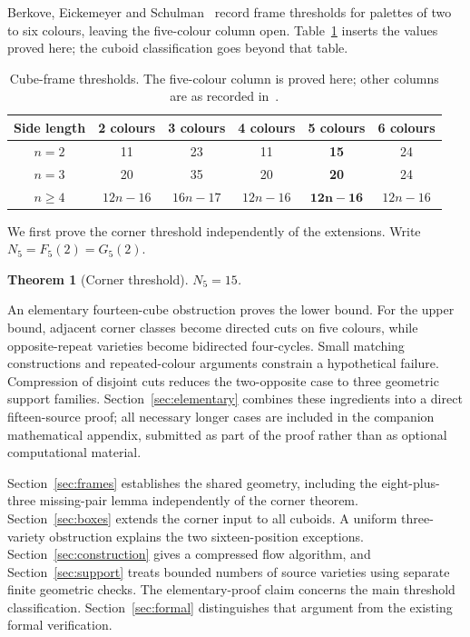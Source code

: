\documentclass[11pt]{article}
\newtheorem{theorem}{Theorem}
\theoremstyle{remark}
\begin{document}
Berkove, Eickemeyer and Schulman~\cite[Section 8, Table 7]{BES} record
frame thresholds for palettes of two to six colours, leaving the
five-colour column open. Table~\ref{tab:palette-thresholds} inserts the
values proved here; the cuboid classification goes beyond that table.
\begin{table}[ht]
\centering
\small
\begin{tabular}{c c c c c c}
\toprule
Side length & 2 colours & 3 colours & 4 colours & \textbf{5 colours} & 6 colours\\
\midrule
$n=2$ & 11 & 23 & 11 & \textbf{15} & 24\\
$n=3$ & 20 & 35 & 20 & \textbf{20} & 24\\
$n\ge4$ & $12n-16$ & $16n-17$ & $12n-16$ & $\boldsymbol{12n-16}$ & $12n-16$\\
\bottomrule
\end{tabular}
\caption{Cube-frame thresholds. The five-colour column is proved here;
other columns are as recorded in~\cite[Table 7]{BES}.}
\label{tab:palette-thresholds}
\end{table}

We first prove the corner threshold independently of the extensions.
Write $N_5=F_5(2)=G_5(2)$.
\begin{theorem}[Corner threshold]\label{thm:main}
$N_5=15$.
\end{theorem}
An elementary fourteen-cube obstruction proves the lower bound.
For the upper bound, adjacent corner classes become directed cuts on five
colours, while opposite-repeat varieties become bidirected four-cycles.
Small matching constructions and repeated-colour arguments constrain a
hypothetical failure. Compression of disjoint cuts reduces the two-opposite
case to three geometric support families. Section~\ref{sec:elementary}
combines these ingredients into a direct fifteen-source proof; all necessary
longer cases are included in the companion mathematical appendix, submitted
as part of the proof rather than as optional computational material.

Section~\ref{sec:frames} establishes the shared geometry, including the
eight-plus-three missing-pair lemma independently of the corner theorem.
Section~\ref{sec:boxes} extends the corner input to all cuboids. A uniform
three-variety obstruction explains the two sixteen-position exceptions.
Section~\ref{sec:construction} gives a compressed flow algorithm, and
Section~\ref{sec:support} treats bounded numbers of source varieties using
separate finite geometric checks. The elementary-proof claim concerns the
main threshold classification. Section~\ref{sec:formal} distinguishes that
argument from the existing formal verification.
\end{document}
